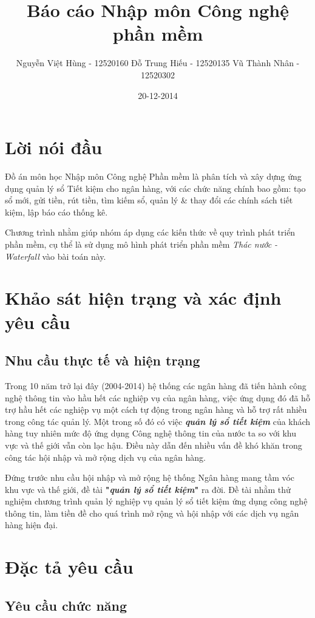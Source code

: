 \documentclass{article}
\title{Báo cáo Nhập môn Công nghệ phần mềm}
\date{20-12-2014}
\author{
	Nguyễn Việt Hùng - 12520160
	Đỗ Trung Hiếu - 12520135
	Vũ Thành Nhân - 12520302
}
\begin{document}
	\tableofcontents
	\newpage
	
	\section{Lời nói đầu}
	Đồ án môn học Nhập môn Công nghệ Phần mềm là phân tích và xây dựng ứng dụng quản lý sổ Tiết kiệm cho ngân hàng, với các chức năng chính bao gồm: tạo sổ mới, gửi tiền, rút tiền, tìm kiếm sổ, quản lý \& thay đổi các chính sách tiết kiệm, lập báo cáo thống kê.
	
	Chương trình nhằm giúp nhóm áp dụng các kiến thức về quy trình phát triển phần mềm, cụ thể là sử dụng mô hình phát triển phần mềm \textit{Thác nước - Waterfall} vào bài toán này.
	
	\section{Khảo sát hiện trạng và xác định yêu cầu}
	\subsection{Nhu cầu thực tế và hiện trạng}
	
	Trong 10 năm trở lại đây (2004-2014) hệ thống các ngân hàng đã tiến
	hành công nghệ thông tin vào hầu hết các nghiệp vụ của ngân hàng, việc ứng dụng đó đã hỗ trợ hầu hết các nghiệp vụ một cách tự động trong ngân hàng và hỗ trợ rất nhiều trong công tác quản lý. Một trong số đó có việc \emph{\textbf{quản lý sổ tiết kiệm}} của khách hàng tuy nhiên mức độ ứng dụng Công nghệ thông tin của nước ta so với khu vực và thế giới vẫn còn lạc hậu. Điều này dẫn đến nhiều vấn đề khó khăn trong công tác hội nhập và mở rộng dịch vụ của ngân hàng.
	
	Đứng trước nhu cầu hội nhập và mở rộng hệ thống Ngân hàng mang tầm vóc khu vực và thế giới, đề tài \textbf{"\textit{quản lý sổ tiết kiệm}"} ra đời. Đề tài nhằm thử nghiệm chương trình quản lý nghiệp vụ quản lý sổ tiết kiệm ứng dụng công nghệ thông tin, làm tiền đề cho quá trình mở rộng và hội nhập với các dịch vụ ngân hàng hiện đại.
	
	
	\section{Đặc tả yêu cầu}
	\subsection{Yêu cầu chức năng}
	
\end{document}
